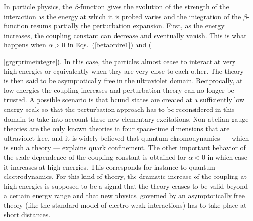\documentclass[floatfix,twocolumn,preprintnumbers,amsmath,amssymb,prb]{revtex4}
\begin{document}
{In particle physics, the $\beta$-function gives the evolution of the strength of the interaction as the energy
at which it is probed varies and the integration of the $\beta$-function resums partially the
perturbation expansion. First, as the
energy increases, the coupling constant can decrease and eventually
vanish. This is what happens when $\alpha>0$ in
Eqs.~(\ref{betaordre1}) and ({\ref{grgrprimeintegre}). In this
case, the particles almost cease to interact at very high energies
or equivalently when they are very close to each other. The theory
is then said to be asymptotically free in the ultraviolet
domain.\cite{collins84,lebellac91} Reciprocally, at low energies
the coupling increases and perturbation theory can no longer be
trusted. A possible scenario is that bound states are created at a
sufficiently low energy scale so that the perturbation approach
has to be reconsidered in this domain to take into account these
new elementary excitations. Non-abelian gauge theories are the
only known theories in four space-time dimensions that are
ultraviolet free, and it is widely believed that quantum
chromodynamics --- which is such a theory --- explains quark
confinement. The other important behavior of the scale
dependence of the coupling constant is obtained
for $\alpha<0$ in which case it increases at high energies. This 
corresponds for instance to quantum electrodynamics. For this kind of theory,
the dramatic increase of the coupling at high energies is supposed
to be a signal that the theory ceases to be valid beyond a certain
energy range and that new physics, governed by an asymptotically
free theory (like the standard model of electro-weak
interactions) has to take place at short distances. 

}}
\end{document}
